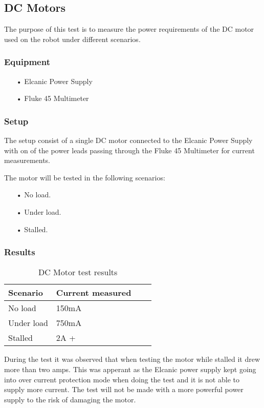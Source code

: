 \subsection{DC Motors}
The purpose of this test is to measure the power requirements of the DC motor used on the robot under different scenarios.
\subsubsection{Equipment}
\begin{enumerate}
	\item[•]Elcanic Power Supply
	\item[•]Fluke 45 Multimeter
\end{enumerate}

\subsubsection{Setup}
The setup consist of a single DC motor connected to the Elcanic Power Supply with on of the power leads passing through the Fluke 45 Multimeter for current measurements.

The motor will be tested in the following scenarios:
\begin{enumerate}
	\item[•]No load.
	\item[•]Under load.
	\item[•]Stalled.
\end{enumerate}

\subsubsection{Results}
\begin{table}[h]
\centering
\label{dcmotortest}
\begin{tabular}{|l|l|l|l|}
\hline
\textbf{Scenario} & \textbf{Current measured} \\ \hline
No load          & 150mA \\ \hline
Under load       & 750mA \\ \hline
Stalled         	 & 2A + \\ \hline
\end{tabular}
\caption{DC Motor test results}
\end{table}
During the test it was observed that when testing the motor while stalled it drew more than two amps. This was apperant as the Elcanic power supply kept going into over current protection mode when doing the test and it is not able to supply more current. The test will not be made with a more powerful power supply to the risk of damaging the motor.